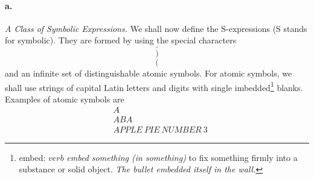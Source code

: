 \documentclass[11pt, a4paper]{article}
\begin{document}
\paragraph{a.}\textit{A Class of Symbolic Expressions.}
We shall now define the S-expressions (S stands for symbolic). They are formed
by using the special characters
$$ \cdot $$
$$ ) $$
$$ ( $$
and an infinite set of distinguishable atomic symbols. For atomic symbols, we
shall use strings of capital Latin letters and digits with single
imbedded\footnote{embed: $verb$ \textit{embed something (in something)} to fix
  something firmly into a substance or solid object. \textit{The bullet embedded
    itself in the wall.}}
blanks. Examples of atomic symbols are
\begin{align*}
&A   \\
&ABA \\
&APPLE \ PIE \ NUMBER \ 3
\end{align*}
\end{document}
